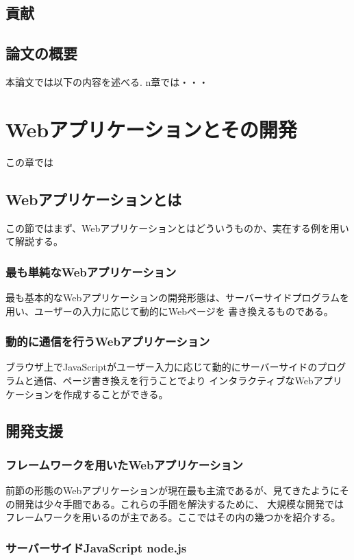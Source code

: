 \documentclass[a4j,12pt]{jreport}
\begin{document}
\section{貢献}

\section{論文の概要}
 本論文では以下の内容を述べる.
 n章では・・・

\chapter{Webアプリケーションとその開発}
この章では
\section{Webアプリケーションとは}
この節ではまず、Webアプリケーションとはどういうものか、実在する例を用いて解説する。

\subsection{最も単純なWebアプリケーション}
最も基本的なWebアプリケーションの開発形態は、サーバーサイドプログラムを用い、ユーザーの入力に応じて動的にWebページを
書き換えるものである。

\subsection{動的に通信を行うWebアプリケーション}
ブラウザ上でJavaScriptがユーザー入力に応じて動的にサーバーサイドのプログラムと通信、ページ書き換えを行うことでより
インタラクティブなWebアプリケーションを作成することができる。


\section{開発支援}
\subsection{フレームワークを用いたWebアプリケーション}
前節の形態のWebアプリケーションが現在最も主流であるが、見てきたようにその開発は少々手間である。これらの手間を解決するために、
大規模な開発ではフレームワークを用いるのが主である。ここではその内の幾つかを紹介する。

\subsection{サーバーサイドJavaScript node.js}
\end{document}
